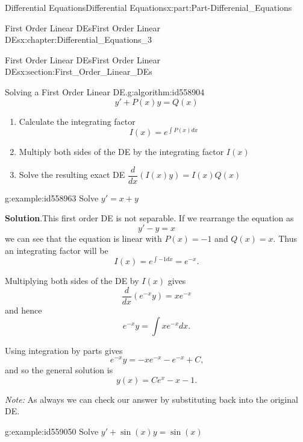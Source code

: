 \documentclass[oneside,10pt,]{book}
\newcommand{\blocktitlefont}{\relax}
\numberwithin{equation}{section}
\begin{document}
\begin{partptx}{Differential Equations}{}{Differential Equations}{}{}{x:part:Part-Differenial_Equations}
\begin{chapterptx}{First Order Linear DEs}{}{First Order Linear DEs}{}{}{x:chapter:Differential_Equations_3}
\begin{sectionptx}{First Order Linear DEs}{}{First Order Linear DEs}{}{}{x:section:First_Order_Linear_DEs}
\begin{algorithm}{Solving a First Order Linear DE.}{}{g:algorithm:id558904}
\begin{equation*}
y' + P(x) y = Q(x)
\end{equation*}
%
\begin{enumerate}[label=\arabic*]
\item{}Calculate the integrating factor%
\begin{equation*}
I(x) = e^{\int P(x) dx}
\end{equation*}
%
\item{}Multiply both sides of the DE by the integrating factor \(I(x)\)%
\item{}Solve the resulting exact DE \(\dfrac{d}{dx} \left(I(x) y \right) = I(x) Q(x)\)%
\end{enumerate}
%
\end{algorithm}
\begin{example}{}{g:example:id558963}%
Solve \(y' = x+y\)%
\par\smallskip%
\noindent\textbf{\blocktitlefont Solution}.\hypertarget{g:solution:id558948}{}\quad{}This first order DE is not separable.  If we rearrange the equation as%
\begin{equation*}
y'-y = x
\end{equation*}
we can see that the equation is linear with \(P(x) = -1\) and \(Q(x) = x\). Thus an integrating factor will be%
\begin{equation*}
I(x) = e^{\int -1 dx} = e^{-x}\text{.}
\end{equation*}
%
\par
Multiplying both sides of the DE by \(I(x)\) gives%
\begin{equation*}
\dfrac{d}{dx} \left( e^{-x} y \right) = x e^{-x}
\end{equation*}
and hence%
\begin{equation*}
e^{-x} y = \int xe^{-x} dx\text{.}
\end{equation*}
%
\par
Using integration by parts gives%
\begin{equation*}
e^{-x} y = -xe^{-x} - e^{-x} + C\text{,}
\end{equation*}
and so the general solution is%
\begin{equation*}
y(x) = Ce^x - x - 1\text{.}
\end{equation*}
%
\par
\emph{Note:} As always we can check our answer by substituting back into the original DE.%
\end{example}
\begin{example}{}{g:example:id559050}%
Solve \(y' + \sin(x)y = \sin(x)\)%
\par\smallskip%

\end{example}
\end{sectionptx}
\end{chapterptx}
\end{partptx}
\end{document}
